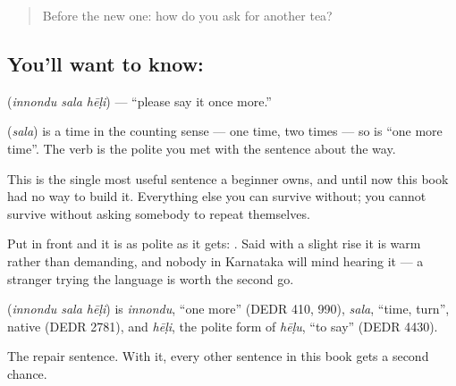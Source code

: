 \label{lesson:KA-C71-say-again}



\begin{quote}
Before the new one: how do you ask for another tea?
\end{quote}

\subsection*{You'll want to know:   }
\textbf{  } (\emph{innondu sala hēḷi}) — \textquotedblleft{}please say it once more.\textquotedblright{}

 (\emph{sala}) is a time in the counting sense — one time, two times — so   is \textquotedblleft{}one more time\textquotedblright{}. The verb is the polite  you met with the sentence about the way.

This is the single most useful sentence a beginner owns, and until now this book had no way to build it. Everything else you can survive without; you cannot survive without asking somebody to repeat themselves.

Put  in front and it is as polite as it gets: \textbf{   }. Said with a slight rise it is warm rather than demanding, and nobody in Karnataka will mind hearing it — a stranger trying the language is worth the second go.

\begin{cousinweb}
\textbf{  } (\emph{innondu sala hēḷi}) is \emph{innondu}, \textquotedblleft{}one more\textquotedblright{} (DEDR 410, 990), \emph{sala}, \textquotedblleft{}time, turn\textquotedblright{}, native (DEDR 2781), and \emph{hēḷi}, the polite form of \emph{hēḷu}, \textquotedblleft{}to say\textquotedblright{} (DEDR 4430).
\end{cousinweb}

\begin{grammarlens}[title={What you've built}]
The repair sentence. With it, every other sentence in this book gets a second chance.
\end{grammarlens}

